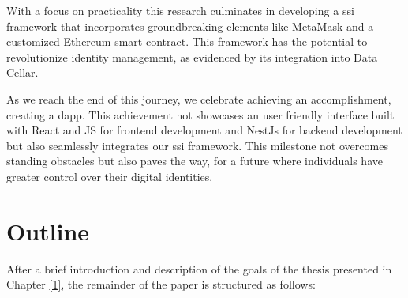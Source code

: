 With a focus on practicality this research culminates in developing a \gls{ssi} framework that incorporates groundbreaking elements like MetaMask and a customized Ethereum smart 
contract. This framework has the potential to revolutionize identity management, as evidenced by its integration into Data Cellar.

As we reach the end of this journey, we celebrate achieving an accomplishment, creating a \acrfull{dapp}. This achievement not showcases an user friendly interface 
built with React and JS for frontend development and NestJs for backend development but also seamlessly integrates our \gls{ssi} framework. This milestone not overcomes standing 
obstacles but also paves the way, for a future where individuals have greater control over their digital identities.

\section{Outline}

After a brief introduction and description of the goals of the thesis presented in Chapter \hyperref[ch:introduction]{[1]}, the remainder of the paper is structured as follows:

